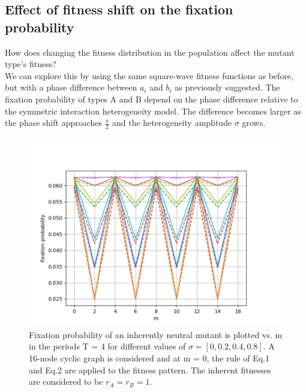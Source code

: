 \documentclass{article}
\begin{document}
\subsection{Effect of fitness shift on the fixation probability}
How does changing the fitness distribution in the population affect the mutant type’s fitness?\\
We can explore this by using the same square-wave fitness functions as before, but with a phase difference between $a_i$ and $b_i$ as previously suggested. The fixation probability of types A and B depend on the phase difference relative to the symmetric interaction heterogeneity model. The difference becomes larger as the phase shift approaches $\frac{\pi}{2}$ and the heterogeneity amplitude $\sigma$ grows.
\vspace{-1cm}
\begin{figure}[H]
    \centering
    \includegraphics[width=0.5\linewidth]{shift.PNG}
    \caption{Fixation probability of an inherently neutral mutant is plotted vs. m in the periods T = 4 for
different values of $\sigma = [0, 0.2, 0.4, 0.8]$. A 16-node cyclic graph is considered and at m = 0, the rule of Eq.1 and Eq.2 are applied to the fitness pattern. The inherent fitnesses are considered to be $r_A = r_B = 1$.}
\end{figure}
\end{document}
